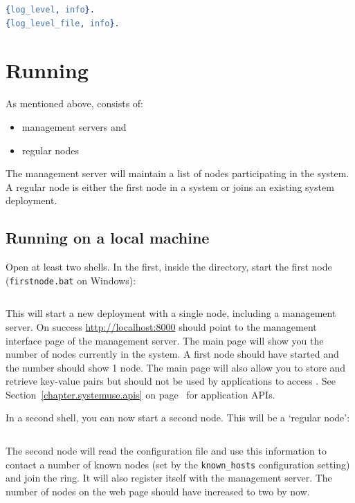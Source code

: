 \documentclass[a4paper]{scrreprt}
\newcommand{\sieheref}[1]{\ref{#1} on page~\pageref{#1}}
\newcommand{\code}[1]{\lstinline[basicstyle=\ttfamily]!#1!}
\begin{document}
\begin{lstlisting}[language=erlang]
%% @doc Loglevel: debug < info < warn < error < fatal < none
{log_level, info}.
{log_level_file, info}.
\end{lstlisting}


\section{Running \scalaris{}}

As mentioned above, \scalaris{} consists of:
\begin{itemize}
\setlength{\itemsep}{0pt}
\setlength{\parskip}{0pt}
\item management servers and
\item regular nodes
\end{itemize}

The management server will maintain a list of nodes participating in the
system. A regular node is either the first node in a system or joins an
existing system deployment.

\subsection{Running on a local machine}
\label{sec.boot}

Open at least two shells. In the first, inside the \scalaris{} directory,
start the first node (\code{firstnode.bat} on Windows):
\begin{lstlisting}[language=sh]
%> ./bin/firstnode.sh
\end{lstlisting}

This will start a new \scalaris{} deployment with a single node, including a
management server. On success \url{http://localhost:8000} should point to
the management interface page of the management server. The main page will
show you the number of nodes currently in the system.
A first \scalaris{} node should have started and the number should
show 1 node. The main page will also allow you to store and retrieve
key-value pairs but should not be used by applications to access
\scalaris{}. See Section~\sieheref{chapter.systemuse.apis} for application APIs.

In a second shell, you can now start a second \scalaris{} node. This
will be a `regular node':
\begin{lstlisting}[language=sh]
%> ./bin/joining_node.sh
\end{lstlisting}

The second node will read the configuration file and use this information to
contact a number of known nodes (set by the \code{known_hosts} configuration
setting) and join the ring. It will also register itself with the management
server.
The number of nodes on the web page should have increased to two by now.
\end{document}
